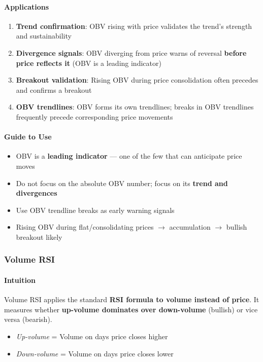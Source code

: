 \documentclass[12pt,openany]{book}
\begin{document}
\paragraph{Applications}
\begin{enumerate}[leftmargin=*]
    \item \textbf{Trend confirmation}: OBV rising with price validates the trend's strength and sustainability
    \item \textbf{Divergence signals}: OBV diverging from price warns of reversal \textbf{before price reflects it} (OBV is a leading indicator)
    \item \textbf{Breakout validation}: Rising OBV during price consolidation often precedes and confirms a breakout
    \item \textbf{OBV trendlines}: OBV forms its own trendlines; breaks in OBV trendlines frequently precede corresponding price movements
\end{enumerate}

\paragraph{Guide to Use}
\begin{itemize}[leftmargin=*]
    \item OBV is a \textbf{leading indicator} --- one of the few that can anticipate price moves
    \item Do not focus on the absolute OBV number; focus on its \textbf{trend and divergences}
    \item Use OBV trendline breaks as early warning signals
    \item Rising OBV during flat/consolidating prices \(\rightarrow\) accumulation \(\rightarrow\) bullish breakout likely
\end{itemize}

\subsubsection{Volume RSI}

\paragraph{Intuition}
Volume RSI applies the standard \textbf{RSI formula to volume instead of price}. It measures whether \textbf{up-volume dominates over down-volume} (bullish) or vice versa (bearish).

\begin{itemize}[leftmargin=*]
    \item \emph{Up-volume} = Volume on days price closes higher
    \item \emph{Down-volume} = Volume on days price closes lower
\end{itemize}
\end{document}
